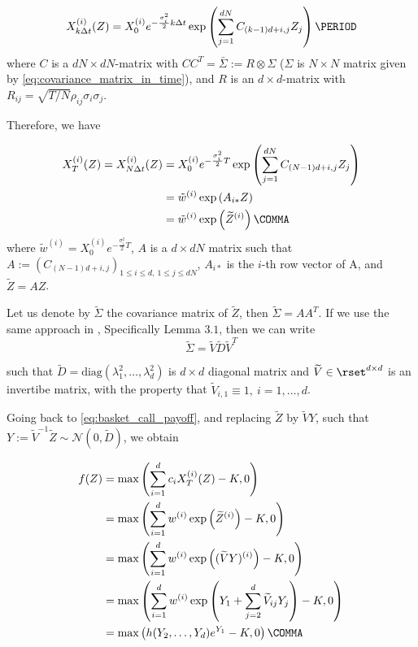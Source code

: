 \begin{equation}
X^{(i)}_{k \Delta t} (Z)=X^{(i)}_0 e^{-\frac{\sigma_i^2}{2} k \Delta t} \exp\left(\sum_{j=1}^{d  N} C_{(k-1) d +i,j} Z_j\right) \PERIOD
\end{equation}
where $C$ is a $dN \times dN$-matrix with $C C^T=\bar{\Sigma}:=R  \otimes \Sigma$ ($\Sigma$ is $N \times N$ matrix  given by \eqref{eq:covariance_matrix_in_time}), and $R$ is an $d \times d$-matrix with $R_{ij}=\sqrt{T/N} \rho_{ij} \sigma_i\sigma_j$. 

Therefore, we have

\begin{align}\label{eq:asset_dynamics_last_inc}
X^{(i)}_{T} (Z)=X^{(i)}_{N \Delta t}(Z)&=X^{(i)}_0 e^{-\frac{\sigma_i^2}{2} T} \exp\left(\sum_{j=1}^{d  N} C_{(N-1) d +i,j} Z_j\right) \nonumber\\
&=\tilde{w}^{(i)}  \exp\left(A_{i\ast} Z\right)\nonumber\\
&=\tilde{w}^{(i)}  \exp\left(\widetilde{Z}^{(i)}\right)\COMMA
\end{align}
where $\tilde{w}^{(i)}=X^{(i)}_0 e^{-\frac{\sigma_i^2}{2} T} $,  $A$ is a   $d \times dN$  matrix such that $A:=\left(C_{(N-1) d +i,j} \right)_{1 \le i \le d, \: 1 \le j \le dN }$,  $A_{i\ast}$ is the $i$-th row vector of A, and $\widetilde{Z}=AZ$.

Let us denote by $\widetilde{\Sigma}$ the covariance matrix of $\widetilde{Z}$, then $\widetilde{\Sigma}=A A^T$. If we use the same approach in \cite{bayersmoothing}, Specifically Lemma $3.1$, then we can write 
\begin{equation}
\widetilde{\Sigma}=\widetilde{V} \widetilde{D} \widetilde{V}^T
\end{equation} 

such that $\tilde{D}=\text{diag}(\lambda_1^2, \dots, \lambda_d^2)$ is $d \times d$ diagonal matrix and $\widetilde{V} \in \rset^{d \times d}$ is an invertibe matrix, with the property that $\widetilde{V}_{i,1} \equiv 1,\: i=1,\dots,d$.


Going back to \eqref{eq:basket_call_payoff}, and replacing $\widetilde{Z}$ by $\widetilde{V} Y$, such that  $Y:=\widetilde{V}^{-1} \widetilde{Z} \sim \mathcal{N}(0,\widetilde{D})$, we obtain

\begin{align}\label{eq:basket_call_payoff_2}
f(Z)&=\max\left(\sum_{i=1}^{d} c_i X^{(i)}_T(Z) -K,0\right) \nonumber\\
&=\max\left(\sum_{i=1}^{d} w^{(i)} \exp\left(\widetilde{Z}^{(i)}\right) -K,0\right) \nonumber\\
&=\max\left(\sum_{i=1}^{d} w^{(i)} \exp\left((\widetilde{V} Y)^{(i)}\right) -K,0\right) \nonumber\\
&=\max\left(\sum_{i=1}^{d} w^{(i)} \exp\left( Y_1+ \sum_{j=2}^{d}\widetilde{V}_{ij} Y_j\right) -K,0\right) \nonumber\\
&=\max\left(h(Y_2, \dots,Y_d) e^{Y_1} -K,0\right) \COMMA
\end{align}

